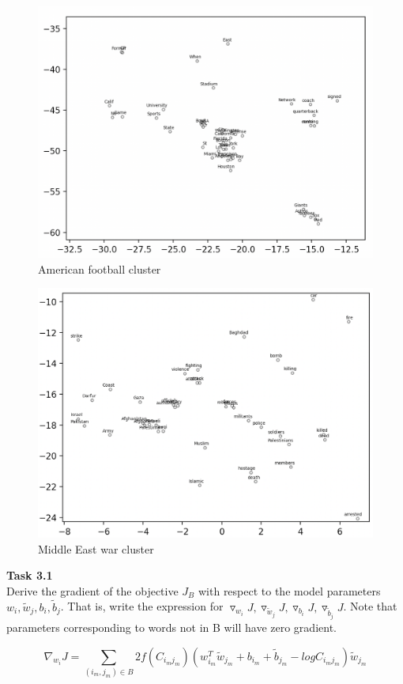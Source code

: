 \documentclass[12pt,article]{article}
\newenvironment{task}[2][Task]
    { \begin{mdframed}[backgroundcolor=gray!20] \textbf{#1 #2} \\}
    {  \end{mdframed}}
\begin{document}
\begin{figure}[H]
    \centering
    \includegraphics[scale=0.6]{american_football.png} \par
    \caption{American football cluster}
    \label{fig:q2-american-football}
\end{figure}


\begin{figure}[H]
    \centering
    \includegraphics[scale=0.6]{middleeast_war.png} \par
    \caption{Middle East war cluster}
    \label{fig:q2-middle-east}
\end{figure}

\newpage
\begin{task}{3.1}
Derive the gradient of the objective $J_B$ with respect to the model parameters $w_i, \widetilde{w}_j, b_i, \widetilde{b}_j$. That is, write the expression for $\triangledown_{w_i}J, \triangledown_{\widetilde{w}_j}J, \triangledown_{b_i}J, \triangledown_{\widetilde{b}_j}J$. Note that parameters corresponding to words not in B will have zero gradient.
\end{task}
$$\nabla_{w_i}J = \sum_{(i_m,j_m) \in B} 2 f(C_{i_mj_m})(w_{i_m}^T\widetilde{w}_{j_m} + b_{i_m} + \widetilde{b}_{j_m} - logC_{i_mj_m})\widetilde{w}_{j_m}$$
\end{document}
